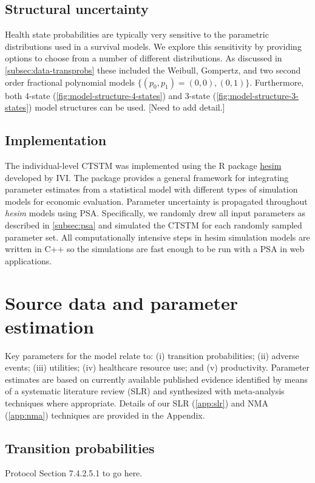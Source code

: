 \documentclass[11pt,final,fleqn]{article}\usepackage[]{graphicx}\usepackage[]{color}
\theoremstyle{plain}
\newcommand{\pkg}[1]{{\fontseries{b}\selectfont #1}}
\begin{document}
{\subsection{Structural uncertainty}

Health state probabilities are typically very sensitive to the parametric distributions used in a survival models. We explore this sensitivity by providing options to choose from a number of different distributions. As discussed in \autoref{subsec:data-transprobs} these included the Weibull, Gompertz, and two second order fractional polynomial models $\{(p_0, p_1) = (0, 0), (0,1)\}$. 
Furthermore, both  4-state (\autoref{fig:model-structure-4-states}) and 3-state (\autoref{fig:model-structure-3-states}) model structures can be used. [Need to add detail.]


\subsection{Implementation} 
The individual-level CTSTM was implemented using the R package \href{https://innovationvalueinitiative.github.io/hesim/}{\pkg{hesim}} developed by IVI. The package provides a general framework for integrating parameter estimates from a statistical model with different types of simulation models for economic evaluation. Parameter uncertainty is propagated throughout \textit{hesim} models using PSA. Specifically, we randomly drew all input parameters as described in \autoref{subsec:psa} and simulated the CTSTM for each randomly sampled parameter set. All computationally intensive steps in \pkg{hesim} simulation models are written in C++ so the simulations are fast enough to be run with a PSA in web applications.

\section{Source data and parameter estimation}\label{sec:data}
Key parameters for the model relate to: (i) transition probabilities; (ii) adverse events; (iii) utilities; (iv) healthcare resource use; and (v) productivity. Parameter estimates are based on currently available published evidence identified by means of a systematic literature review (SLR) and synthesized with meta-analysis techniques where appropriate. Details of our SLR (\autoref{app:slr}) and NMA (\autoref{app:nma})  techniques are provided in the Appendix. 

\subsection{Transition probabilities}\label{subsec:data-transprobs}
Protocol Section 7.4.2.5.1 to go here.

}
\end{document}
